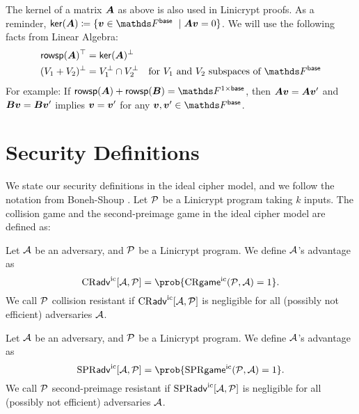 The kernel of a matrix $\v A$ as above is also used in Linicrypt proofs.
As a reminder, $\ker(\v A) \coloneqq \{ \vv \in \Fsp\ \mid \v A \vv = 0\}$.
We will use the following facts from Linear Algebra:
\begin{align*}
  \rowsp(\v A)^\top &= \ker(\v A)^\perp \\
  (V_1 + V_2)^\perp &= V_1^\perp \cap V_2^\perp \quad \textrm{for $V_1$ and $V_2$ subspaces of $\Fsp$}
\end{align*}
For example:
If $\rowsp(\v A) + \rowsp(\v B) = \Frowsp$,
then $\v A \vv = \v A \vv'$ and $\v B \vv = \v B \vv'$ implies $\vv = \vv'$ for any $\vv, \vv' \in \Fsp$.

\section{Security Definitions}
We state our security definitions in the ideal cipher model, and we
follow the notation from Boneh-Shoup \cite{Boneh2015CourseIA}.
Let $\P$ be a Linicrypt program taking $k$ inputs.
The collision game and the second-preimage game in the ideal cipher model are defined as:
\begin{pchstack}[center, space=0.4cm]
\end{pchstack}

\begin{defn}
\label{defn:collision_resistance_ic}
  Let $\A$ be an adversary, and $\P$ be a Linicrypt program.
  We define $\A$'s advantage as 
  \[
    \cradv[\A, \P] = \prob{\crgame(\P, \A) = 1}.
  \]
  We call $\P$ collision resistant if
  $\cradv[\A, \P]$ is negligible for all (possibly not efficient) adversaries $\A$.
\end{defn}

\begin{defn}
\label{defn:second_preimage_resistance_ic}
  Let $\A$ be an adversary, and $\P$ be a Linicrypt program.
  We define $\A$'s advantage as 
  \[
    \spradv[\A, \P] = \prob{\sprgame(\P, \A) = 1}.
  \]
  We call $\P$ second-preimage resistant
  if $\spradv[\A, \P]$ is negligible for all (possibly not efficient) adversaries $\A$.
\end{defn}

